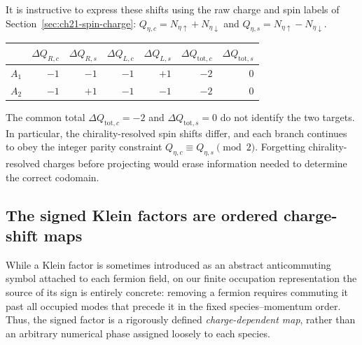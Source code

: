 It is instructive to express these shifts using the raw charge and spin
labels of Section~\ref{sec:ch21-spin-charge}:
\(Q_{\eta,c}=N_{\eta\uparrow}+N_{\eta\downarrow}\) and
\(Q_{\eta,s}=N_{\eta\uparrow}-N_{\eta\downarrow}\).
\begin{center}
\begin{tabular}{@{}lrrrrrr@{}}
\toprule
 & $\Delta Q_{R,c}$ & $\Delta Q_{R,s}$
 & $\Delta Q_{L,c}$ & $\Delta Q_{L,s}$
 & $\Delta Q_{\mathrm{tot},c}$ & $\Delta Q_{\mathrm{tot},s}$\\
\midrule
$A_1$ & $-1$ & $-1$ & $-1$ & $+1$ & $-2$ & $0$\\
$A_2$ & $-1$ & $+1$ & $-1$ & $-1$ & $-2$ & $0$\\
\bottomrule
\end{tabular}
\end{center}
The common total \(\Delta Q_{\mathrm{tot},c}=-2\) and
\(\Delta Q_{\mathrm{tot},s}=0\) do not identify the two targets.  In
particular, the chirality-resolved spin shifts differ, and each branch
continues to obey the integer parity constraint
\(Q_{\eta,c}\equiv Q_{\eta,s}\pmod 2\).  Forgetting chirality-resolved
charges before projecting would erase information needed to determine the
correct codomain.

\subsection*{The signed Klein factors are ordered charge-shift maps}

While a Klein factor is sometimes introduced as an abstract anticommuting symbol attached to each fermion field, on our finite occupation representation the source of its sign is entirely concrete: removing a fermion requires commuting it past all occupied modes that precede it in the fixed species--momentum order. Thus, the signed factor is a rigorously defined \emph{charge-dependent map}, rather than an arbitrary numerical phase assigned loosely to each species.


